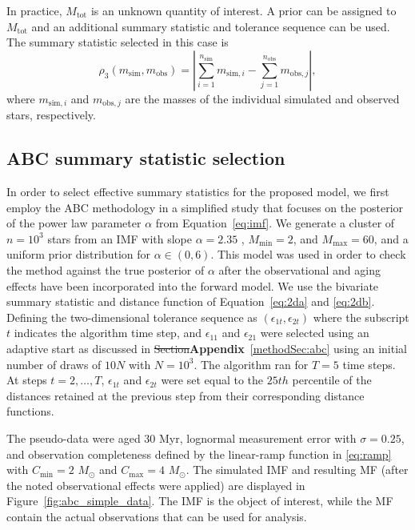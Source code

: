 \documentclass[ejs]{imsart}
\numberwithin{equation}{section}
\theoremstyle{plain}
\newcommand{\new}[1]{{\bf #1}}
\newcommand{\remove}[1]{\st{#1}}
\newcommand{\Msun}{M_{\odot}}
\newcommand{\msim}{m_{\text{sim}}}
\newcommand{\mobs}{m_{\text{obs}}}
\newcommand{\nsim}{n_{\text{sim}}}
\newcommand{\nobs}{n_{\text{obs}}}
\newcommand{\Cmin}{C_{\text{min}}}
\newcommand{\Cmax}{C_{\text{max}}}
\newcommand{\Mtot}{M_{\text{tot}}}
\newcommand{\Mmax}{M_{\text{max}}}
\newcommand{\Mmin}{M_{\text{min}}}
\begin{document}
In practice, $\Mtot$ is an unknown quantity of interest.  A prior can be assigned to $\Mtot$ and an additional summary statistic and tolerance sequence can be used.  The summary statistic selected in this case is
\begin{equation}
\rho_3(\msim, \mobs) = \left| \sum_{i = 1}^{\nsim} m_{\text{sim}, i} - \sum_{j = 1}^{\nobs} m_{\text{obs}, j} \right|, \label{eq:2dc}
\end{equation}
where $m_{\text{sim}, i}$ and $m_{\text{obs}, j}$ are the masses of the individual simulated and observed stars, respectively.  


\subsection{ABC summary statistic selection} \label{app:summary}
In order to select effective summary statistics for the proposed model, we first employ the ABC methodology in a simplified study that focuses on the posterior of the power law parameter $\alpha$ from Equation~\eqref{eq:imf}.  We generate a cluster of $n = 10^3$ stars from an IMF with slope $\alpha = 2.35$  \citep{salpeter55}, $\Mmin = 2$, and $\Mmax = 60$,  and a uniform prior distribution for $\alpha \in (0, 6)$.  
%
This  model was used in order to check the method against the true posterior of $\alpha$ after the observational and aging effects have been incorporated into the forward model.  We use the bivariate summary statistic and distance function of Equation~\eqref{eq:2da} and \eqref{eq:2db}.  Defining the two-dimensional tolerance sequence as $(\epsilon_{1t}, \epsilon_{2t})$ where the subscript $t$ indicates the algorithm time step, and  $\epsilon_{11}$ and $\epsilon_{21}$ were selected using an adaptive start as discussed in \remove{Section}\new{Appendix}~\ref{methodSec:abc} using an initial number of draws of $10N$ with $N = 10^3$.  The algorithm ran for $T = 5$ time steps.
At steps $t = 2,\ldots,T$, $\epsilon_{1t}$ and $\epsilon_{2t}$ were set equal to the $25th$ percentile of the distances retained at the previous step from their corresponding distance functions.


The pseudo-data were aged 30 Myr, lognormal measurement error with $\sigma = 0.25$, and observation completeness defined by the linear-ramp function in \eqref{eq:ramp} with $\Cmin = 2$ $\Msun$ and $\Cmax = 4$ $\Msun$.  The simulated IMF and resulting MF (after the noted observational effects were applied) are displayed in Figure~\ref{fig:abc_simple_data}.  The IMF is the object of interest, while the MF contain the actual observations that can be used for analysis.
\end{document}
